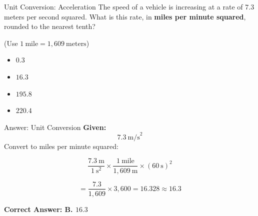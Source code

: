 \documentclass{beamer}
\begin{document}
\begin{frame}{Unit Conversion: Acceleration}
    The speed of a vehicle is increasing at a rate of \(7.3\) meters per second squared.  
    What is this rate, in \textbf{miles per minute squared}, rounded to the nearest tenth?

    \vspace{0.5em}
    (Use \(1~\text{mile} = 1{,}609~\text{meters}\))

    \vspace{1em}
    \begin{itemize}
        \item[\textbf{A.}] \(0.3\)
        \item[\textbf{B.}] \(16.3\)
        \item[\textbf{C.}] \(195.8\)
        \item[\textbf{D.}] \(220.4\)
    \end{itemize}
\end{frame}


\begin{frame}{Answer: Unit Conversion}
    \textbf{Given:}  
    \[
    7.3~\text{m/s}^2
    \]
    Convert to miles per minute squared:

    \vspace{0.5em}
    \[
    \frac{7.3~\text{m}}{1~\text{s}^2} \times \frac{1~\text{mile}}{1{,}609~\text{m}} \times \left(60~\text{s}\right)^2
    \]

    \vspace{0.5em}
    \[
    = \frac{7.3}{1{,}609} \times 3{,}600 = 16.328 \approx \boxed{16.3}
    \]

    \textbf{Correct Answer: \textcolor{novelPurple}{B. \(16.3\)}}
\end{frame}
\end{document}
